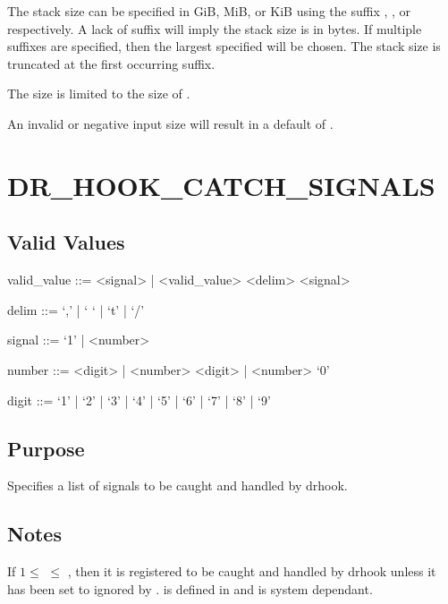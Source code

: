 \documentclass[letterpaper,10pt,english]{sphinxmanual}
\begin{document}
\sphinxAtStartPar
The stack size can be specified in GiB, MiB, or KiB using the suffix , , or  respectively. A lack of suffix will imply the stack size is in bytes. If multiple suffixes are specified, then the largest specified will be chosen. The stack size is truncated at the first occurring suffix.

\sphinxAtStartPar
The size is limited to the size of .

\sphinxAtStartPar
An invalid or negative input size will result in a default of .


\section{DR\_HOOK\_CATCH\_SIGNALS}
\label{\detokenize{flag/flag:dr-hook-catch-signals}}\label{\detokenize{flag/flag:id8}}

\subsection{Valid Values}
\label{\detokenize{flag/flag:id9}}
\begin{DUlineblock}{0em}
\item[] valid\_value ::= \textless{}signal\textgreater{} |  \textless{}valid\_value\textgreater{} \textless{}delim\textgreater{} \textless{}signal\textgreater{}
\item[] delim ::= ‘,’ | ‘ ‘ | ‘t’ | ‘/’
\item[] signal ::= ‘\sphinxhyphen{}1’ | \textless{}number\textgreater{}
\item[] number ::= \textless{}digit\textgreater{} | \textless{}number\textgreater{} \textless{}digit\textgreater{} | \textless{}number\textgreater{} ‘0’
\item[] digit ::= ‘1’ | ‘2’ | ‘3’ | ‘4’ | ‘5’ | ‘6’ | ‘7’ | ‘8’ | ‘9’
\end{DUlineblock}


\subsection{Purpose}
\label{\detokenize{flag/flag:id10}}
\sphinxAtStartPar
Specifies a list of signals to be caught and handled by drhook.


\subsection{Notes}
\label{\detokenize{flag/flag:id11}}
\sphinxAtStartPar
If \(1 \leq\)  \(\leq\) , then it is registered to be caught and handled by drhook \sphinxhyphen{} unless it has been set to ignored by
{\hyperref[\detokenize{flag/flag:dr-hook-ignore-signals}]{}}.  is defined in  and is system dependant.
\end{document}
